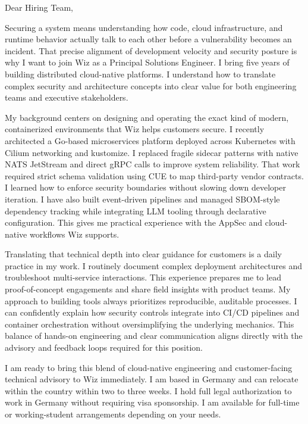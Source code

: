 \documentclass[11pt,a4paper]{coverletter}
\begin{document}

\opening{Dear Hiring Team,}

Securing a system means understanding how code, cloud infrastructure, and runtime behavior actually talk to each other before a vulnerability becomes an incident. That precise alignment of development velocity and security posture is why I want to join Wiz as a Principal Solutions Engineer. I bring five years of building distributed cloud-native platforms. I understand how to translate complex security and architecture concepts into clear value for both engineering teams and executive stakeholders.

My background centers on designing and operating the exact kind of modern, containerized environments that Wiz helps customers secure. I recently architected a Go-based microservices platform deployed across Kubernetes with Cilium networking and kustomize. I replaced fragile sidecar patterns with native NATS JetStream and direct gRPC calls to improve system reliability. That work required strict schema validation using CUE to map third-party vendor contracts. I learned how to enforce security boundaries without slowing down developer iteration. I have also built event-driven pipelines and managed SBOM-style dependency tracking while integrating LLM tooling through declarative configuration. This gives me practical experience with the AppSec and cloud-native workflows Wiz supports.

Translating that technical depth into clear guidance for customers is a daily practice in my work. I routinely document complex deployment architectures and troubleshoot multi-service interactions. This experience prepares me to lead proof-of-concept engagements and share field insights with product teams. My approach to building tools always prioritizes reproducible, auditable processes. I can confidently explain how security controls integrate into CI/CD pipelines and container orchestration without oversimplifying the underlying mechanics. This balance of hands-on engineering and clear communication aligns directly with the advisory and feedback loops required for this position.

I am ready to bring this blend of cloud-native engineering and customer-facing technical advisory to Wiz immediately. I am based in Germany and can relocate within the country within two to three weeks. I hold full legal authorization to work in Germany without requiring visa sponsorship. I am available for full-time or working-student arrangements depending on your needs.
\end{document}
